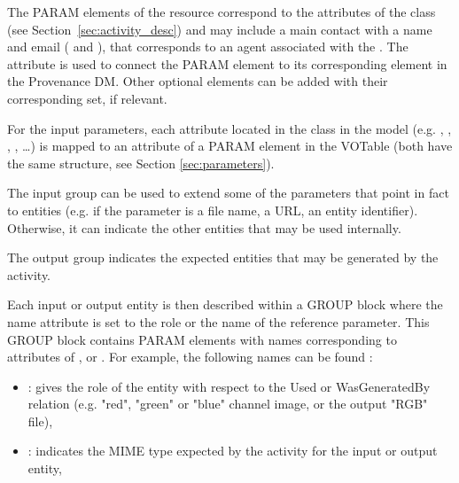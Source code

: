 
The PARAM elements of the resource correspond to the attributes of the  class (see Section~\ref{sec:activity_desc}) and may include a main contact with a name and email ( and ), that corresponds to an agent associated with the .
The  attribute is used to connect the PARAM element to its corresponding element in the Provenance DM. Other optional elements can be added with their corresponding  set, if relevant.

For the input parameters, each attribute located in the  class in the model (e.g. , , , , \dots) is mapped to an attribute of a PARAM element in the VOTable (both have the same structure, see Section \ref{sec:parameters}).

The input group can be used to extend some of the parameters that point in fact to entities (e.g. if the parameter is a file name, a URL, an entity identifier).
Otherwise, it can indicate the other entities that may be used internally.

The output group indicates the expected entities that may be generated by the activity.

Each input or output entity is then described within a GROUP block where the name attribute is set to the role or the name of the reference parameter. 
This GROUP block contains PARAM elements with names corresponding to attributes of ,  or .
For example, the following names can be found :
\begin{itemize}
 \item {}: gives the role of the entity with respect to the Used or WasGeneratedBy relation (e.g. "red", "green" or "blue" channel image, or the output "RGB" file),
 \item {}: indicates the MIME type expected by the activity for the input or output entity,
 \end{itemize} 


